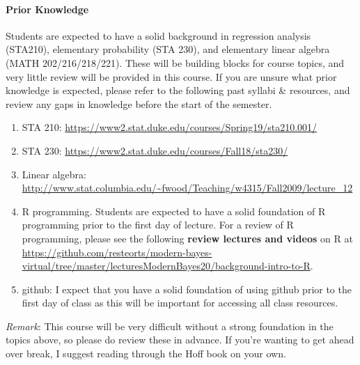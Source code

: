 \documentclass[11pt]{article}
\begin{document}


\paragraph{Prior Knowledge}
Students are expected to have a solid background in regression analysis (STA210), elementary probability (STA 230), and elementary linear algebra (MATH 202/216/218/221). These will be building blocks for course topics, and very little review will be provided in this course.  If you are unsure what prior knowledge is expected, please refer to the following past syllabi \& resources, and review any gaps in knowledge before the start of the semester. 
\begin{enumerate}
\item STA 210: \url{https://www2.stat.duke.edu/courses/Spring19/sta210.001/}
\item STA 230: \url{https://www2.stat.duke.edu/courses/Fall18/sta230/}
\item Linear algebra: \url{http://www.stat.columbia.edu/~fwood/Teaching/w4315/Fall2009/lecture_12}
\item R programming. Students are expected to have a solid foundation of R programming prior to the first day of lecture. For a review of R programming, please see the following \textbf{review lectures and videos} on R at \url{https://github.com/resteorts/modern-bayes-virtual/tree/master/lecturesModernBayes20/background-intro-to-R}.
\item github: I expect that you have a solid foundation of using github prior to the first day of class as this will be important for accessing all class resources.  
\end{enumerate}
\emph{Remark}: This course will be very difficult without a strong foundation in the topics above, so please do review these in advance. If you're wanting to get ahead over break, I suggest reading through the Hoff book on your own. \\
\end{document}

